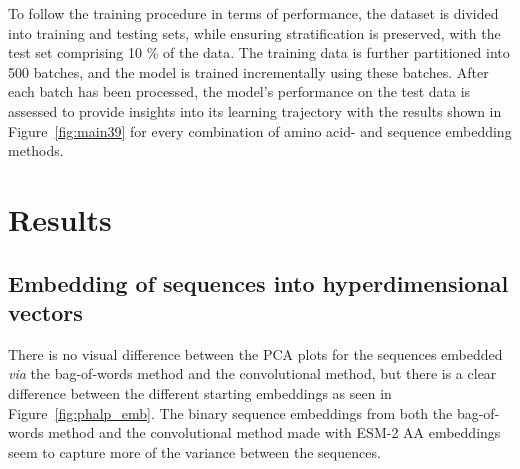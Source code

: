 To follow the training procedure in terms of performance, the dataset is divided into training and testing sets, while ensuring stratification is preserved, with the test set comprising 10 \% of the data. The training data is further partitioned into 500 batches, and the model is trained incrementally using these batches. After each batch has been processed, the model's performance on the test data is assessed to provide insights into its learning trajectory with the results shown in Figure~\ref{fig:main39} for every combination of amino acid- and sequence embedding methods.

\section{Results}
\subsection*{Embedding of sequences into hyperdimensional vectors}
There is no visual difference between the PCA plots for the sequences embedded \textit{via} the bag-of-words method and the convolutional method, but there is a clear difference between the different starting embeddings as seen in Figure~\ref{fig:phalp_emb}. The binary sequence embeddings from both the bag-of-words method and the convolutional method made with ESM-2 AA embeddings seem to capture more of the variance between the sequences.

